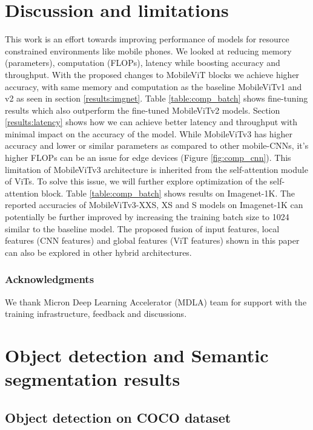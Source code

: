 \documentclass{article} \usepackage{iclr2022_conference,times}
\begin{document}
\section{Discussion and limitations}
This work is an effort towards improving performance of models for resource constrained environments like mobile phones.
We looked at reducing memory (parameters), computation (FLOPs), latency while boosting accuracy and throughput.
With the proposed changes to MobileViT blocks we achieve higher accuracy, with same memory and computation as the baseline MobileViTv1 and v2 as seen in section \ref{results:imgnet}. Table \ref{table:comp_batch} shows fine-tuning results which also outperform the fine-tuned MobileViTv2 models.
Section \ref{results:latency} shows how we can achieve better latency and throughput with minimal impact on the accuracy of the model.
While MobileViTv3 has higher accuracy and lower or similar parameters as compared to other mobile-CNNs, it's higher FLOPs can be an issue for edge devices (Figure \ref{fig:comp_cnn}).
This limitation of MobileViTv3 architecture is inherited from the self-attention module of ViTs.
To solve this issue, we will further explore optimization of the self-attention block.
Table \ref{table:comp_batch} shows results on Imagenet-1K. The reported accuracies of MobileViTv3-XXS, XS and S models on Imagenet-1K can potentially be further improved by increasing the training batch size to 1024 similar to the baseline model.
The proposed fusion of input features, local features (CNN features) and global features (ViT features) shown in this paper can also be explored in other hybrid architectures.


\subsubsection*{Acknowledgments}
We thank Micron Deep Learning Accelerator (MDLA) team for support with the training infrastructure, feedback and discussions.





\appendix


\section{Object detection and Semantic segmentation results}

\subsection{Object detection on COCO dataset}
\end{document}
